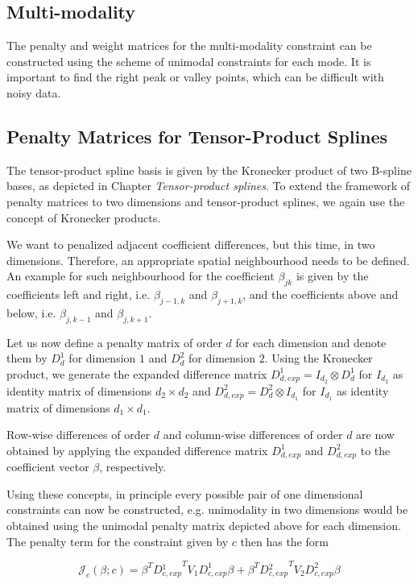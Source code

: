 \subsection{Multi-modality} 
	
The penalty and weight matrices for the multi-modality constraint can be constructed using the scheme of unimodal constraints for each mode. It is important to find the right peak or valley points, which can be difficult with noisy data. 

\subsection{Penalty Matrices for Tensor-Product Splines}

The tensor-product spline basis is given by the Kronecker product of two B-spline bases, as depicted in Chapter \emph{Tensor-product splines}. To extend the framework of penalty matrices to two dimensions and tensor-product splines, we again use the concept of Kronecker products. 

We want to penalized adjacent coefficient differences, but this time, in two dimensions. Therefore, an appropriate spatial neighbourhood needs to be defined. An example for such neighbourhood for the coefficient $\beta_{jk}$ is given by the coefficients left and right, i.e. $\beta_{j-1, k}$ and $\beta_{j+1, k}$, and the coefficients above and below, i.e. $\beta_{j, k-1}$ and $\beta_{j,k+1}$. 

Let us now define a penalty matrix of order $d$ for each dimension and denote them by $D^1_d$ for dimension $1$ and $D^2_d$ for dimension $2$. Using the Kronecker product, we generate the expanded difference matrix $D_{d, exp}^1 = I_{d_2} \otimes D^1_d$ for $I_{d_2}$ as identity matrix of dimensions $d_2 \times d_2$ and $D_{d,exp}^2 = D^2_d \otimes I_{d_1}$ for $I_{d_1}$ as identity matrix of dimensions $d_1 \times d_1$. 

Row-wise differences of order $d$ and column-wise differences of order $d$ are now obtained by applying the expanded difference matrix $D_{d,exp}^1$ and $D_{d,exp}^2$ to the coefficient vector $\beta$, respectively. 

Using these concepts, in principle every possible pair of one dimensional constraints can now be constructed, e.g. unimodality in two dimensions would be obtained using the unimodal penalty matrix depicted above for each dimension. The penalty term for the constraint given by $c$ then has the form

$$\mathcal J_c(\beta; c) = \beta^T D{^1_{c,exp}}^T V_1 D_{c,exp}^1 \beta + \beta^T D{^2_{c,exp}}^T V_2 D_{c,exp}^2 \beta$$

